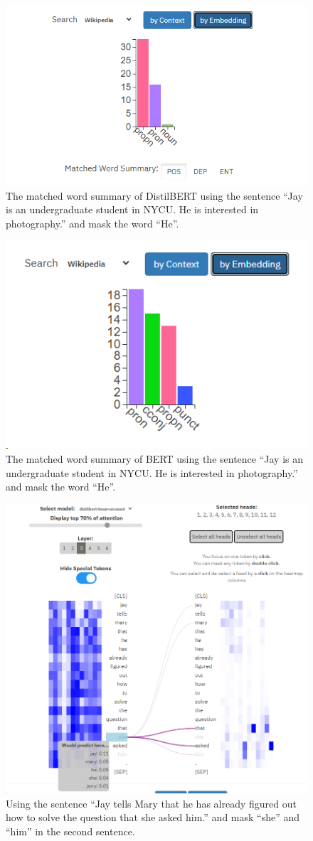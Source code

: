 \documentclass{article}[12pt]
\begin{document}
\begin{figure}
	\centering
	\includegraphics[width=0.7\linewidth]{figure/exbert-distil4}
	\caption{The matched word summary of DistilBERT using the sentence ``Jay is an undergraduate student in NYCU. He is interested in photography.'' and mask the word ``He''.}
	\label{fig:exbert-distilbert-embedding}
\end{figure}

\begin{figure}
	\centering
	\includegraphics[width=0.7\linewidth]{figure/exbert-distil5}
	\caption{The matched word summary of BERT using the sentence ``Jay is an undergraduate student in NYCU. He is interested in photography.'' and mask the word ``He''.}
	\label{fig:exbert-bert-embedding}
\end{figure}


\begin{figure}[htbp]
	\centering
	\includegraphics[width=0.7\linewidth]{figure/exbert-distil3}
	\caption{Using the sentence ``Jay tells Mary that he has already figured out how to solve the question that she asked him.'' and mask ``she'' and ``him'' in the second sentence.}
	\label{fig:exbert-distil3}
\end{figure}
\end{document}
